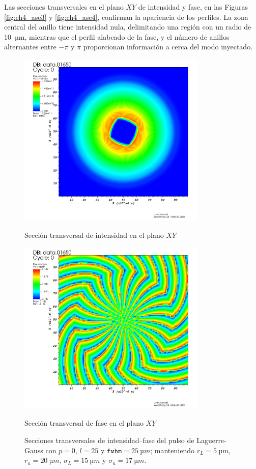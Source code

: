 Las secciones transversales en el plano $XY$ de intensidad y fase, en las Figuras \ref{fig:ch4_ase3} y \ref{fig:ch4_ase4}, confirman la apariencia de los perfiles. La zona central del anillo tiene intensidad nula, delimitando una región con un radio de \qty{10}{µm}, mientras que el perfil alabeado de la fase, y el número de anillos alternantes entre $-\pi$ y $\pi$ proporcionan información a cerca del modo inyectado.

\begin{figure}[htbp]
  \centering
  \begin{subcaptionblock}{.4\textwidth}
    \centering
    \includegraphics[width=0.8\textwidth]{Figuras/ch4_ase1.png}
    \caption{Sección transversal de intensidad en el plano $XY$}\label{fig:ch4_ase3}
  \end{subcaptionblock}
  \begin{subcaptionblock}{.4\textwidth}
    \centering
    \includegraphics[width=0.8\textwidth]{Figuras/ch4_ase2.png}
    \caption{Sección transversal de fase en el plano $XY$}\label{fig:ch4_ase4}
  \end{subcaptionblock}
   \caption{Secciones transversales de intensidad--fase del pulso de Laguerre-Gauss con $p=0$, $l=25$ y $\texttt{fwhm}=\qty{25}{µm}$; manteniendo $r_{L}=\qty{5}{µm}$, $r_{u}=\qty{20}{µm}$, $\sigma_{L}=\qty{15}{µm}$ y $\sigma_{u}=\qty{17}{µm}$.}
   \label{fig:4.39}
\end{figure}
